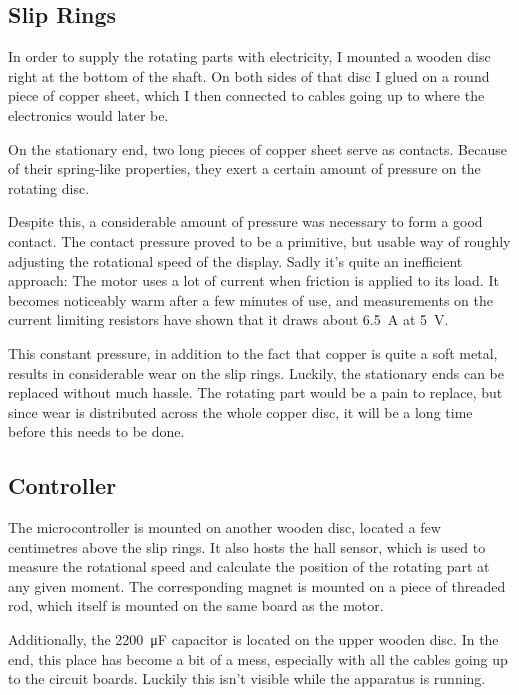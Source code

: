 \documentclass[a4paper, 11pt, titlepage]{report}
\begin{document}
\subsection{Slip Rings}

In order to supply the rotating parts with electricity, I mounted a wooden disc right at the bottom
of the shaft. On both sides of that disc I glued on a round piece of copper sheet, which I then
connected to cables going up to where the electronics would later be.

On the stationary end, two long pieces of copper sheet serve as contacts. Because of their
spring-like properties, they exert a certain amount of pressure on the rotating disc.

Despite this, a considerable amount of pressure was necessary to form a good contact. The contact
pressure proved to be a primitive, but usable way of roughly adjusting the rotational speed of
the display. Sadly it's quite an inefficient approach: The motor uses a lot of current when
friction is applied to its load. It becomes noticeably warm after a few minutes of use, and
measurements on the current limiting resistors have shown that it draws about \SI{6.5}{\ampere} at
\SI{5}{\volt}.

This constant pressure, in addition to the fact that copper is quite a soft metal, results in
considerable wear on the slip rings. Luckily, the stationary ends can be replaced without much
hassle. The rotating part would be a pain to replace, but since wear is distributed across the
whole copper disc, it will be a long time before this needs to be done.


\subsection{Controller}

The microcontroller is mounted on another wooden disc, located a few centimetres above the slip
rings. It also hosts the hall sensor, which is used to measure the rotational speed and calculate
the position of the rotating part at any given moment. The corresponding magnet is mounted on a
piece of threaded rod, which itself is mounted on the same board as the motor.

Additionally, the \SI{2200}{\micro\farad} capacitor is located on the upper wooden disc. In the
end, this place has become a bit of a mess, especially with all the cables going up to the circuit
boards. Luckily this isn't visible while the apparatus is running.
\end{document}
